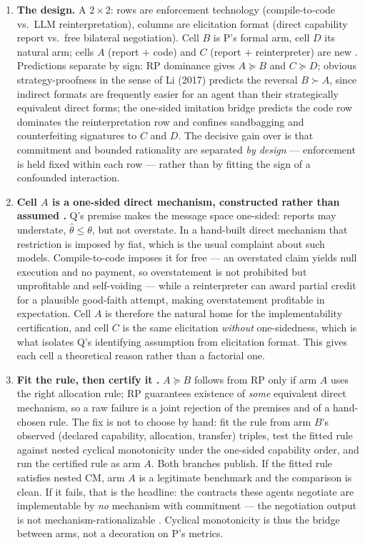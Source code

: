 \documentclass{article}
\begin{document}
\begin{enumerate}
\item \textbf{The design.} A \(2 \times 2\): rows are enforcement technology (compile-to-code vs.\ LLM reinterpretation), columns are elicitation format (direct capability report vs.\ free bilateral negotiation). Cell \(B\) is P's formal arm, cell \(D\) its natural arm; cells \(A\) (report + code) and \(C\) (report + reinterpreter) are new . Predictions separate by sign: RP dominance gives \(A \succeq B\) and \(C \succeq D\); obvious strategy-proofness in the sense of Li (2017) predicts the reversal \(B \succ A\), since indirect formats are frequently easier for an agent than their strategically equivalent direct forms; the one-sided imitation bridge predicts the code row dominates the reinterpretation row and confines sandbagging and counterfeiting signatures to \(C\) and \(D\). The decisive gain over  is that commitment and bounded rationality are separated \emph{by design} --- enforcement is held fixed within each row --- rather than by fitting the sign of a confounded interaction.

\item \textbf{Cell \(A\) is a one-sided direct mechanism, constructed rather than assumed .} Q's premise makes the message space one-sided: reports may understate, \(\hat{\theta} \le \theta\), but not overstate. In a hand-built direct mechanism that restriction is imposed by fiat, which is the usual complaint about such models. Compile-to-code imposes it for free --- an overstated claim yields null execution and no payment, so overstatement is not prohibited but unprofitable and self-voiding --- while a reinterpreter can award partial credit for a plausible good-faith attempt, making overstatement profitable in expectation. Cell \(A\) is therefore the natural home for the implementability certification, and cell \(C\) is the same elicitation \emph{without} one-sidedness, which is what isolates Q's identifying assumption from elicitation format. This gives each cell a theoretical reason rather than a factorial one.

\item \textbf{Fit the rule, then certify it .} \(A \succeq B\) follows from RP only if arm \(A\) uses the right allocation rule; RP guarantees existence of \emph{some} equivalent direct mechanism, so a raw failure is a joint rejection of the premises and of a hand-chosen rule. The fix is not to choose by hand: fit the rule from arm \(B\)'s observed (declared capability, allocation, transfer) triples, test the fitted rule against nested cyclical monotonicity under the one-sided capability order, and run the certified rule as arm \(A\). Both branches publish. If the fitted rule satisfies nested CM, arm \(A\) is a legitimate benchmark and the comparison is clean. If it fails, that is the headline: the contracts these agents negotiate are implementable by \emph{no} mechanism with commitment --- the negotiation output is not mechanism-rationalizable . Cyclical monotonicity is thus the bridge between arms, not a decoration on P's metrics.


\end{enumerate}
\end{document}
